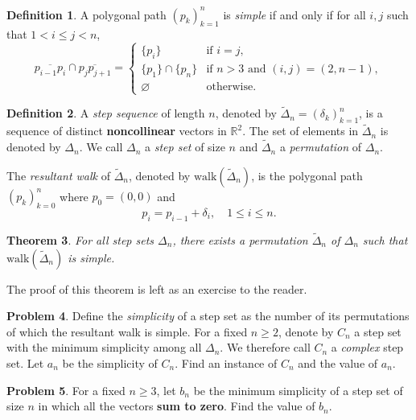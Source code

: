 \documentclass{amsart}
\newtheorem{theorem}{Theorem}[section]
\theoremstyle{definition}
\newtheorem{definition}[theorem]{Definition}
\newtheorem{problem}[theorem]{Problem}
\theoremstyle{remark}
\begin{document}
\begin{definition}
    A polygonal path $(p_k)_{k=1}^n$ is \emph{simple} if and only if
    for all $i,j$ such that $1<i\le j<n$,
    \[
        \overline{p_{i-1}p_i}\cap\overline{p_jp_{j+1}}=
        \begin{cases}
            \{p_i\}            & \text{if $i=j$},                     \\
            \{p_1\}\cap\{p_n\} & \text{if $n>3$ and $(i,j)=(2,n-1)$}, \\
            \varnothing        & \text{otherwise}.
        \end{cases}
    \]
\end{definition}

\newcommand{\sseq}{\widetilde{\Delta}_n}
\newcommand{\sset}{\Delta_n}

\begin{definition}
    A \emph{step sequence} of length $n$, denoted by $\sseq=(\delta_k)_{k=1}^n$,
    is a sequence of distinct \textbf{noncollinear} vectors in $\mathbb{R}^2$.
    The set of elements in $\sseq$ is denoted by $\sset$.
    We call $\sset$ a \emph{step set} of size $n$ and $\sseq$
    a \emph{permutation} of $\sset$.

    The \emph{resultant walk} of $\sseq$, denoted by $\mathrm{walk}(\sseq)$, is the polygonal path
    $(p_k)_{k=0}^{n}$ where $p_0=(0,0)$ and \[p_i=p_{i-1}+\delta_i,\quad1\le i\le n.\]
\end{definition}

\begin{theorem}
    For all step sets $\sset$, there exists a permutation $\sseq$ of $\sset$
    such that $\mathrm{walk}(\sseq)$ is simple.
\end{theorem}

The proof of this theorem is left as an exercise to the reader.

\newcommand{\csset}{C_n}
\newcommand{\csseq}{\widetilde{C}_n}

\begin{problem}
\label{problem:general}
Define the \emph{simplicity} of a step set as the number of its permutations
of which the resultant walk is simple. For a fixed $n\ge2$, denote by $\csset$
a step set with the minimum simplicity among all $\sset$.
We therefore call $\csset$ a \emph{complex} step set. Let $a_n$ be the
simplicity of $\csset$. Find an instance of $\csset$ and the value of $a_n$.
\end{problem}

\begin{problem}
\label{problem:zerosum}
For a fixed $n\ge3$, let $b_n$ be the minimum simplicity of a step set of size $n$
in which all the vectors \textbf{sum to zero}. Find the value of $b_n$.
\end{problem}
\end{document}
